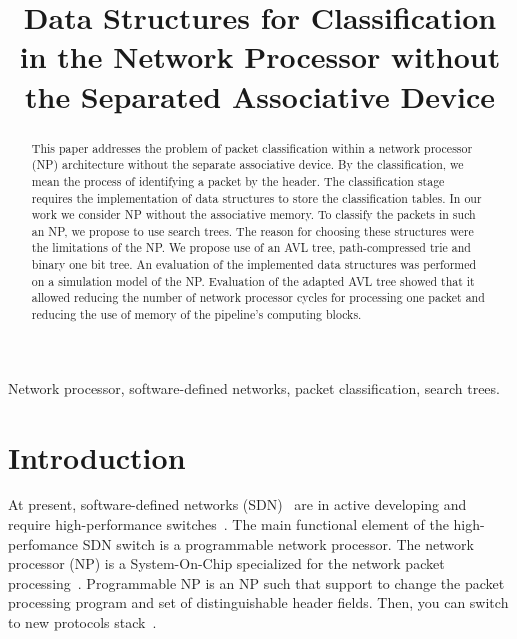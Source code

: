 \documentclass[conference]{IEEEtran}
\begin{document}
\author{
    \and
    \and
    }
\title{
    Data Structures for Classification in the Network Processor without the Separated Associative Device
}
\maketitle
    \begin{abstract}
        This paper addresses the problem of packet classification within a network processor (NP) architecture 
        without the separate associative device.
        By the classification, we mean the process of identifying a packet by the header.
        The classification stage requires the implementation of data structures to store the classification tables.
        In our work we consider NP without the associative memory.
        To classify the packets in such an NP, we propose to use search trees.
        The reason for choosing these structures were the limitations of the NP.
        We propose use of an AVL tree, path-compressed trie and binary one bit tree.
        An evaluation of the implemented data structures was performed on a 
        simulation model of the NP.
        Evaluation of the adapted AVL tree showed that it allowed reducing 
        the number of network processor cycles for processing one packet and reducing the use of memory of the pipeline's computing blocks.
    \end{abstract}
    
    \begin{IEEEkeywords}
        Network processor, software-defined networks, packet classification, search trees.
    \end{IEEEkeywords}
    
    \section{Introduction}
        At present, software-defined networks (SDN)~\cite{smel2012open} are in active developing
        and require high-performance switches~\cite{bifulco2018survey}. 
        The main functional element of the high-perfomance SDN switch is a programmable network processor.
        The network processor (NP) is a System-On-Chip specialized for the network packet processing~\cite{chao2007high:1}.
        Programmable NP is an NP such that support to
        change the packet processing program and set of distinguishable
        header fields. Then, you can switch to new protocols stack~\cite{bezzubtsev2019ob-odnom183708319}.
\end{document}

